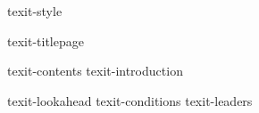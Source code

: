 \environment texit-style

\startdocument

\component texit-titlepage

\startfrontmatter
    \component texit-contents
    \component texit-introduction
\stopfrontmatter

\startbodymatter
    \component texit-lookahead
    \component texit-conditions
    \component texit-leaders
\stopbodymatter

\stopdocument

